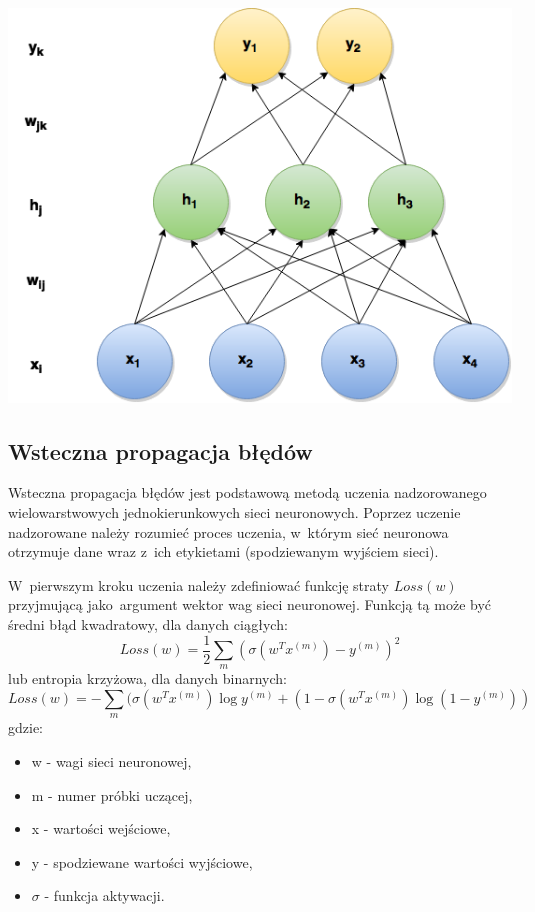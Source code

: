 \begin{Figure}
	\centering
	\includegraphics[width=0.9\linewidth]{img/mgr_backprop_net.png}
\end{Figure}

\subsection{Wsteczna propagacja błędów} \label{ssec:backpropagation}
Wsteczna propagacja błędów jest podstawową metodą uczenia nadzorowanego wielowarstwowych jednokierunkowych
sieci neuronowych. Poprzez uczenie nadzorowane należy rozumieć proces uczenia, w~którym sieć neuronowa
otrzymuje dane wraz z~ich etykietami (spodziewanym wyjściem sieci).

W~pierwszym kroku uczenia należy zdefiniować funkcję straty $Loss(w)$ przyjmującą jako~argument wektor wag
sieci neuronowej. Funkcją tą może być średni błąd kwadratowy, dla danych ciągłych:\\
$$Loss(w)=\frac{1}{2}\sum\limits_{m}(\sigma(w^{T}x^{(m)}) - y^{(m)})^2$$
lub entropia krzyżowa, dla danych binarnych:
$$Loss(w)=-\sum\limits_m(\sigma(w^{T}x^{(m)})\log{y^{(m)}} + (1-\sigma(w^{T}x^{(m)})\log{(1-y^{(m)})})
$$
gdzie:
\begin{itemize}
  \item w - wagi sieci neuronowej,
  \item m - numer próbki uczącej,
  \item x - wartości wejściowe,
  \item y - spodziewane wartości wyjściowe,
  \item $\sigma$ - funkcja aktywacji.
\end{itemize}

